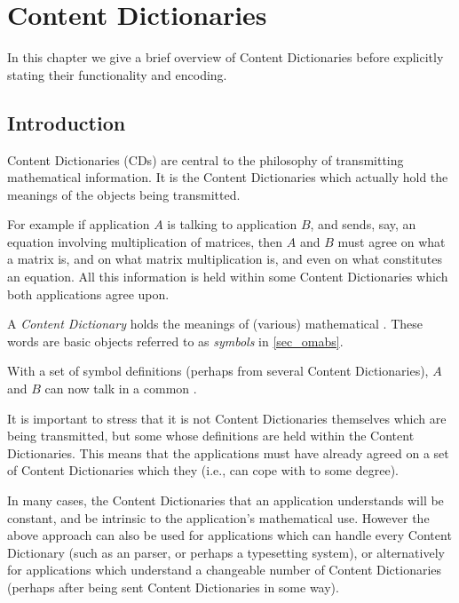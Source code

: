 \chapter{Content Dictionaries}\label{cha_cd}
  
In this chapter we give a brief overview of Content Dictionaries before explicitly stating
their functionality and encoding.

\section{Introduction}\label{sec_cd_summary}
    
Content Dictionaries (CDs) are central to the \OM philosophy of transmitting mathematical
information. It is the \OM Content Dictionaries which actually hold the meanings of the
objects being transmitted.
    
For example if application $A$ is talking to application $B$, and sends, say, an equation
involving multiplication of matrices, then $A$ and $B$ must agree on what a matrix is, and
on what matrix multiplication is, and even on what constitutes an equation. All this
information is held within some Content Dictionaries which both applications agree upon.
    
A \emph{ Content Dictionary} holds the meanings of (various) mathematical
. These words are \OM basic objects referred to as \emph{symbols} in
\ref{sec_omabs}.
    
With a set of symbol definitions (perhaps from several Content Dictionaries), $A$ and $B$
can now talk in a common .
    
It is important to stress that it is not Content Dictionaries themselves which are being
transmitted, but some  whose definitions are held within the
Content Dictionaries. This means that the applications must have already agreed on a set
of Content Dictionaries which they  (i.e., can cope with to some
degree).
    
In many cases, the Content Dictionaries that an application understands will be constant,
and be intrinsic to the application's mathematical use. However the above approach can
also be used for applications which can handle every Content Dictionary (such as an \OM
parser, or perhaps a typesetting system), or alternatively for applications which
understand a changeable number of Content Dictionaries (perhaps after being sent Content
Dictionaries in some way).
    

